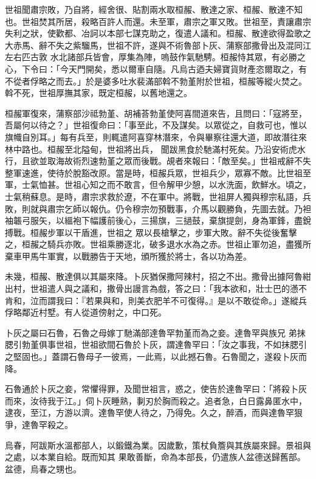 \begin{pinyinscope}
 世祖聞肅宗敗，乃自將，經舍很、貼割兩水取桓赧、散達之家、桓赧、散達不知也。世祖焚其所居，殺略百許人而還。未至軍，肅宗之軍又敗。世祖至，責讓肅宗失利之狀，使歡都、冶訶以本部七謀克助之，復遣人議和。桓赧、散達欲得盈歌之大赤馬、辭不失之紫騮馬，世祖不許，遂與不術魯部卜灰、蒲察部撒骨出及混同江左右匹古敦
 水北諸部兵皆會，厚集為陣，嗚鼓作氣馳騁。桓赧恃其眾，有必勝之心，下令曰：「今天門開矣，悉以爾車自隨。凡烏古迺夫婦寶貨財產恣爾取之，有不從者俘略之而去。」於是婆多吐水裴滿部斡不勃堇附於世祖，桓赧等縱火焚之。斡不死，世祖厚撫其家，既定桓赧，以舊地還之。



 桓赧軍復來，蒲察部沙祗勃堇、胡補荅勃堇使阿喜間道來告，且問曰：「寇將至，吾屬何以待之？」世祖復命曰：「事至此，不及謀矣。以眾從之，自救可也，惟以旗幟自別耳。」每有兵至，則輒遣阿喜穿林潛來，令與畢察往還大道，即故潛往來林中路也。桓赧至北隘甸，世祖將出兵，
 聞跋黑食於馳滿村死矣。乃沿安術虎水行，且欲並取海故術烈速勃堇之眾而後戰。覘者來報曰：「敵至矣。」世祖戒辭不失整軍速進，使待於脫豁改原。當是時，桓赧兵眾，世祖兵少，眾寡不敵。比世祖至軍，士氣恤甚。世祖心知之而不敢言，但令解甲少憩，以水洗面，飲鮮水。頃之，士氣稍蘇息。是時，肅宗求救於遼，不在軍中。將戰，世祖屏人獨與穆宗私語，兵敗，則就與肅宗乞師以報仇。仍令穆宗勿預戰事，介馬以觀勝負，先圖去就。乃袒袖韔弓服矢，以縕袍下幅護前後心，三揚旗，三撾鼓，棄旗提劍，身為軍鋒，盡銳搏戰。桓赧步軍以干盾進，世祖之
 眾以長槍擊之，步軍大敗。辭不失從後奮擊之，桓赧之騎兵亦敗。世祖乘勝逐北，破多退水水為之赤。世祖止軍勿追，盡獲所棄車甲馬牛軍實，以戰勝告于天地，頒所獲於將士，各以功為差。



 未幾，桓赧、散達俱以其屬來降。卜灰猶保撒阿辣村，招之不出。撒骨出據阿魯紺出村，世祖遣人與之議和，撒骨出謾言為戲，答之曰：「我本欲和，壯士巴的懣不肯和，泣而謂我曰：『若果與和，則美衣肥羊不可復得。』是以不敢從命。」遂縱兵俘略鄰近村墅。有人從道傍射之，中口死。



 卜灰之屬曰石魯，石魯之母嫁丁馳滿部達魯罕勃堇而為之妾。達魯罕與族兄
 弟抹腮引勃堇俱事世祖，世祖欲間石魯於卜灰，謂達魯罕曰：「汝之事我，不如抹腮引之堅固也。」蓋謂石魯母子一彼焉，一此焉，以此撼石魯。石魯聞之，遂殺卜灰而降。



 石魯通於卜灰之妾，常懼得罪，及聞世祖言，惑之，使告於達魯罕曰：「將殺卜灰而來，汝待我于江。」伺卜灰睡熟，剚刃於胸而殺之。追者急，白日露鼻匿水中，逮夜，至江，方游以濟。達魯罕使人待之，乃得免。久之，醉酒，而與達魯罕狠爭，達魯罕殺之。



 烏春，阿跋斯水溫都部人，以鍛鐵為業。因歲歉，策杖負簷與其族屬來歸。景祖與之處，以本業自給。既而知其
 果敢善斷，命為本部長，仍遣族人盆德送歸舊部。盆德，烏春之甥也。




\end{pinyinscope}
